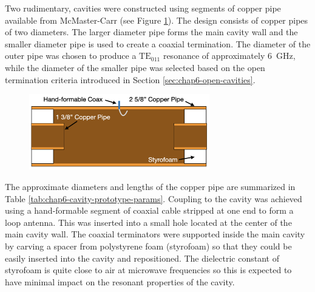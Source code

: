Two rudimentary, cavities were constructed using segments of copper pipe available from McMaster-Carr (see Figure \ref{fig:toy-cavity-cartoon}). The design consists of copper pipes of two diameters. The larger diameter pipe forms the main cavity wall and the smaller diameter pipe is used to create a coaxial termination. The diameter of the outer pipe was chosen to produce a $\mathrm{TE}_{011}$ resonance of approximately 6~GHz, while the diameter of the smaller pipe was selected based on the open termination criteria introduced in Section \ref{sec:chap6-open-cavities}.
\begin{figure}[htbp]
    \centering
    \includegraphics*[width=0.7\textwidth]{figs/Chapter-6/230612_toy_cavity_cartoon.png}
    \caption{\label{fig:toy-cavity-cartoon} }
\end{figure}
The approximate diameters and lengths of the copper pipe are summarized in Table \ref{tab:chap6-cavity-prototype-params}. Coupling to the cavity was achieved using a hand-formable segment of coaxial cable stripped at one end to form a loop antenna. This was inserted into a small hole located at the center of the main cavity wall. The coaxial terminators were supported inside the main cavity by carving a spacer from polystyrene foam (styrofoam) so that they could be easily inserted into the cavity and repositioned. The dielectric constant of styrofoam is quite close to air at microwave frequencies so this is expected to have minimal impact on the resonant properties of the cavity. 

